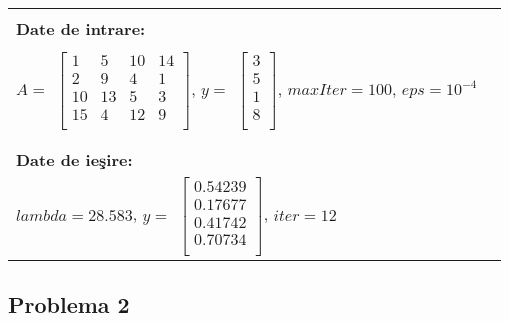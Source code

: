 \documentclass{exam}
\newcommand{\octavescript}[2]{
	
}
\begin{document}
\octavescript{./src/PutereDir.m}{Metoda puterii directe}

\begin{center}
	\begin{tabular}{| l | l |}
		\hline
		\\
		\textbf{Date de intrare:} \\\\
		$A = $
		$\begin{bmatrix}
				 1  & 5  & 10 & 14 \\
				 2  & 9  & 4  & 1  \\
				 10 & 13 & 5  & 3  \\
				 15 & 4  & 12 & 9  \\
			 \end{bmatrix}
		$,
		$ y = $
		$\begin{bmatrix}
				 3 \\
				 5 \\
				 1 \\
				 8 \\
			 \end{bmatrix}
		$,
		$ maxIter = 100$, $eps = 10^{-4}$
		\\ \\
		\hline
		\\
		\textbf{Date de ieşire:}  \\
		$lambda = 28.583$,
		$ y = $
		$\begin{bmatrix}
				 0.54239 \\
				 0.17677 \\
				 0.41742 \\
				 0.70734 \\
			 \end{bmatrix}
		$,
		$iter = 12$               \\
		\hline
	\end{tabular}
\end{center}



\subsection{Problema 2}
\end{document}
